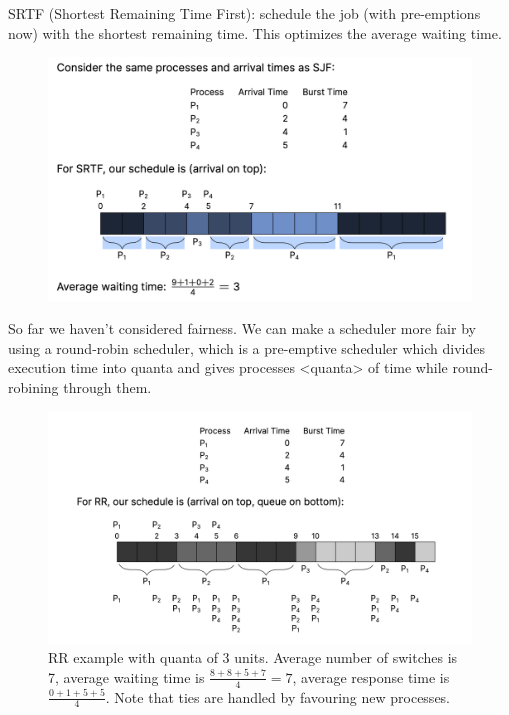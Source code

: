 \documentclass[../notes.tex]{subfiles}
\begin{document}
\begin{definition}
    SRTF (Shortest Remaining Time First): schedule the job (with pre-emptions now) with the shortest remaining time. This optimizes the average waiting time.

    \begin{figure}[H]
        \centering
        \includegraphics[width=0.8\linewidth]{img/image_2023-01-24-01-47-37.png}
    \end{figure}
\end{definition}


So far we haven't considered fairness. We can make a scheduler more fair by using a round-robin scheduler, which is a pre-emptive scheduler which divides execution time into quanta and gives processes <quanta> of time while round-robining through them. 

\begin{figure}[H]
    \centering
    \includegraphics[width=0.8\linewidth]{img/image_2023-01-24-01-49-33.png}
    \caption{RR example with quanta of 3 units. Average number of switches is 7, average waiting time is $ \frac{8+8+5+7}{4} = 7 $, average response time is $ \frac{0 + 1 + 5 + 5 }{4}$. Note that ties are handled by favouring new processes.}
\end{figure}
\end{document}

